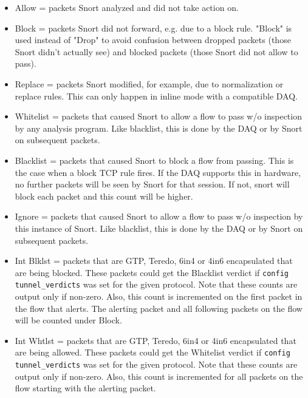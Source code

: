 \documentclass[english]{report}
\begin{document}
\begin{itemize}
\item Allow = packets Snort analyzed and did not take action on. 

\item Block = packets Snort did not forward, e.g. due to a block rule.  "Block"
is used instead of "Drop" to avoid confusion between dropped packets (those
Snort didn't actually see) and blocked packets (those Snort did not allow to
pass).

\item Replace = packets Snort modified, for example, due to normalization or
replace rules.  This can only happen in inline mode with a compatible DAQ.

\item Whitelist = packets that caused Snort to allow a flow to pass w/o
inspection by any analysis program.  Like blacklist, this is done by the DAQ or
by Snort on subsequent packets.

\item Blacklist = packets that caused Snort to block a flow from passing.  This
is the case when a block TCP rule fires.  If the DAQ supports this in hardware,
no further packets will be seen by Snort for that session.  If not, snort will
block each packet and this count will be higher.

\item Ignore = packets that caused Snort to allow a flow to pass w/o inspection
by this instance of Snort.  Like blacklist, this is done by the DAQ or by Snort
on subsequent packets.

\item Int Blklst = packets that are GTP, Teredo, 6in4 or 4in6 encapsulated that are
being blocked.  These packets could get the Blacklist verdict if \texttt{config
tunnel\_verdicts} was set for the given protocol.  Note that these counts are
output only if non-zero.  Also, this count is incremented on the first packet
in the flow that alerts.  The alerting packet and all following packets on the
flow will be counted under Block.

\item Int Whtlst = packets that are GTP, Teredo, 6in4 or 4in6 encapsulated that are
being allowed.  These packets could get the Whitelist verdict if \texttt{config
tunnel\_verdicts} was set for the given protocol.  Note that these counts are
output only if non-zero.  Also, this count is incremented for all packets on
the flow starting with the alerting packet.
\end{itemize}
\end{document}
